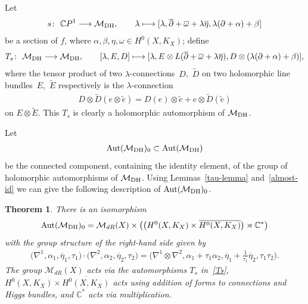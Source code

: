 \documentclass[pdftex]{sigma}
\numberwithin{equation}{section}
\newtheorem{Theorem}{Theorem}[section]
\begin{document}
Let \begin{gather*}s \colon \ {\mathbb C}P^1 \longrightarrow {\mathcal M}_{\rm DH} ,\qquad
\lambda \longmapsto [\lambda, \overline{\partial} +\overline{\omega}+ \lambda\overline{\eta}, \lambda(\partial+\alpha)+\beta]
\end{gather*}
be a section of $f$, where $\alpha, \beta, \eta, \omega \in H^0(X, K_X)$; def\/ine
\begin{gather}\label{Ts}
T_s \colon \ {\mathcal M}_{\rm DH} \longrightarrow {\mathcal M}_{\rm DH} ,\qquad [\lambda, E, D] \longmapsto [\lambda, E\otimes
L(\overline{\partial}+\overline{\omega}+\lambda\overline{\eta}), D\otimes(\lambda(\partial+\alpha)+\beta)] ,
\end{gather}
where the tensor product of two $\lambda$-connections~$D$,~$\widetilde{D}$ on two holomorphic line bundles~$E$,~$\widetilde E$ respectively is the
$\lambda$-connection
\begin{gather*}D\otimes\widetilde{D}(e\otimes\widetilde{e}) = D(e)\otimes \widetilde{e}+e\otimes \widetilde{D}(\widetilde {e})\end{gather*}
on $E\otimes\widetilde{E}$. This $T_s$ is clearly a holomorphic automorphism of ${\mathcal M}_{\rm DH}$.

Let
\begin{gather*}
\operatorname{Aut}({\mathcal M}_{\rm DH})_0 \subset \operatorname{Aut}({\mathcal M}_{\rm DH})
\end{gather*}
be the connected component, containing the identity element, of the group of holomorphic automorphisms of ${\mathcal M}_{\rm DH}$. Using Lemmas~\ref{tau-lemma} and~\ref{almost-id} we can give the following description of $\operatorname{Aut}({\mathcal M}_{\rm DH})_0$.

\begin{Theorem}\label{thmDHa}
There is an isomorphism
\begin{gather*}\operatorname{Aut}({\mathcal M}_{\rm DH})_0 =
\mathcal M_{dR}(X)\times \big(\big(H^0(X, K_X)\times\overline{H^0(X, K_X)}\big)\rtimes {\mathbb C}^*\big)\end{gather*}
with the group structure of the right-hand side given by
\begin{gather}\label{gs37}
\big(\nabla^1, \alpha_1, \overline{\eta}_1, \tau_1\big)\cdot \big(\nabla^2, \alpha_2,\overline{\eta}_2, \tau_2\big) = \big(\nabla^1\otimes\nabla^2, \alpha_1+\tau_1\alpha_2, \overline{\eta}_1+\tfrac{1}{\tau_1}\overline{\eta}_2, \tau_1\tau_2\big) .
\end{gather}
The group $\mathcal M_{dR}(X)$ acts via the automorphisms $T_s$ in~\eqref{Ts}, $H^0(X, K_X)\times\overline{H^0(X, K_X)}$ acts using addition of forms to connections and Higgs bundles, and ${\mathbb C}^*$ acts via multiplication.
\end{Theorem}
\end{document}

